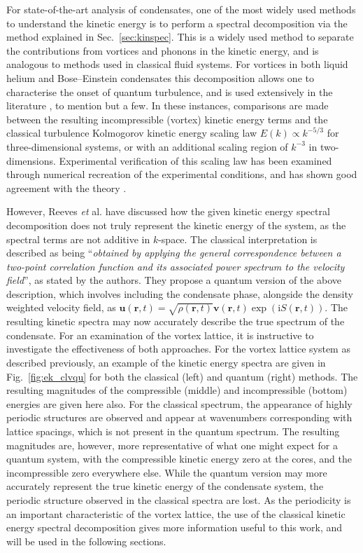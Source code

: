 For state-of-the-art analysis of condensates, one of the most widely used methods to understand the kinetic energy is to perform a spectral decomposition via the method explained in Sec.~\ref{sec:kinspec}. This is a widely used method to separate the contributions from vortices and phonons in the kinetic energy, and is analogous to methods used in classical fluid systems. For vortices in both liquid helium and Bose--Einstein condensates this decomposition allows one to characterise the onset of quantum turbulence, and is used extensively in the literature \cite{VTX:Kobayashi_prl_2005,VTX:Tsubota_jphys_2009,CT:Bradley_prx_2012,VTX:White_jphys_2014,VTX:Skaugen_pre_2016}, to mention but a few. In these instances, comparisons are made between the resulting incompressible (vortex) kinetic energy terms and the classical turbulence Kolmogorov kinetic energy scaling law \cite{BK:Frisch_1995} $E(k) \propto k^{-5/3}$ for three-dimensional systems, or with an additional scaling region of $k^{-3}$ in two-dimensions. Experimental verification of this scaling law has been examined through numerical recreation of the experimental conditions, and has shown good agreement with the theory \cite{VTX:Neely_prl_2013}.

However, Reeves {\it et} al. \cite{VTX:Reeves_pra_2014} have discussed how the given kinetic energy spectral decomposition does not truly represent the kinetic energy of the system, as the spectral terms are not additive in $k$-space. The classical interpretation is described as being ``\textit{obtained by applying the general correspondence between a two-point correlation function and its associated
power spectrum to the velocity field}'', as stated by the authors. They propose a quantum version of the above description, which involves including the condensate phase, alongside the density weighted velocity field, as $\mathbf{u}(\mathbf{r},t) = \sqrt{\rho(\mathbf{r},t)}\mathbf{v}(\mathbf{r},t)\exp\left(\textrm{i}S(\mathbf{r},t)\right)$. The resulting kinetic spectra may now accurately describe the true spectrum of the condensate. For an examination of the vortex lattice, it is instructive to investigate the effectiveness of both approaches. For the vortex lattice system as described previously, an example of the kinetic energy spectra are given in Fig.~\ref{fig:ek_clvqu} for both the classical (left) and quantum (right) methods. The resulting magnitudes of the compressible (middle) and incompressible (bottom) energies are given here also. For the classical spectrum, the appearance of highly periodic structures are observed and appear at wavenumbers corresponding with lattice spacings, which is not present in the quantum spectrum. The resulting magnitudes are, however, more representative of what one might expect for a quantum system, with the compressible kinetic energy zero at the cores, and the incompressible zero everywhere else. While the quantum version may more accurately represent the true kinetic energy of the condensate system, the periodic structure observed in the classical spectra are lost. As the periodicity is an important characteristic of the vortex lattice, the use of the classical kinetic energy spectral decomposition gives more information useful to this work, and will be used in the following sections.

